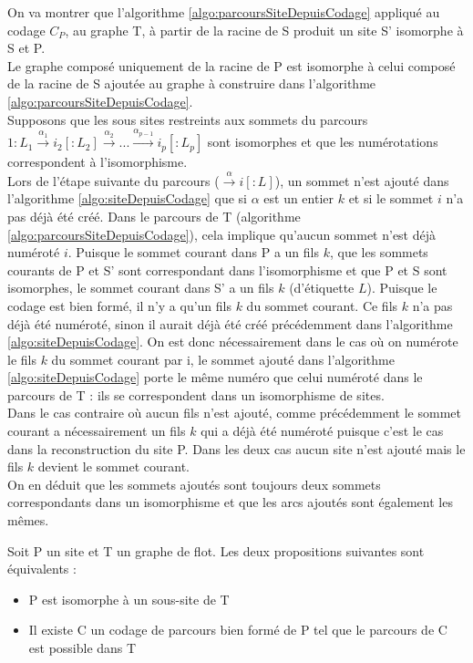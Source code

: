 \begin{pr}
On va montrer que l'algorithme \ref{algo:parcoursSiteDepuisCodage} appliqué au codage $C_P$, au graphe T, à partir de la racine de S produit un site S' isomorphe à S et P. \\
Le graphe composé uniquement de la racine de P est isomorphe à celui composé de la racine de S ajoutée au graphe à construire dans l'algorithme \ref{algo:parcoursSiteDepuisCodage}. \\
Supposons que les sous sites restreints aux sommets du parcours $1:L_1\xrightarrow{\alpha_1}i_2[:L_2]\xrightarrow{\alpha_2} ...\xrightarrow{\alpha_{p-1}}i_{p}[:L_{p}]$ sont isomorphes et que les numérotations correspondent à l'isomorphisme.\\
Lors de l'étape suivante du parcours ($\xrightarrow{\alpha}i[:L]$), un sommet n'est ajouté dans l'algorithme \ref{algo:siteDepuisCodage} que si $\alpha$ est un entier $k$ et si le sommet $i$ n'a pas déjà été créé. Dans le parcours de T (algorithme \ref{algo:parcoursSiteDepuisCodage}), cela implique qu'aucun sommet n'est déjà numéroté $i$. Puisque le sommet courant dans P a un fils $k$, que les sommets courants de P et S' sont correspondant dans l'isomorphisme et que P et S sont isomorphes, le sommet courant dans S' a un fils $k$ (d'étiquette $L$). Puisque le codage est bien formé, il n'y a qu'un fils $k$ du sommet courant. Ce fils $k$ n'a pas déjà été numéroté, sinon il aurait déjà été créé précédemment dans l'algorithme \ref{algo:siteDepuisCodage}. On est donc nécessairement dans le cas où on numérote le fils $k$ du sommet courant par i, le sommet ajouté dans l'algorithme \ref{algo:siteDepuisCodage} porte le même numéro que celui numéroté dans le parcours de T : ils se correspondent dans un isomorphisme de 
sites.\\
Dans le cas contraire où aucun fils n'est ajouté, comme précédemment le sommet courant a nécessairement un fils $k$ qui a déjà été numéroté puisque c'est le cas dans la reconstruction du site P. Dans les deux cas aucun site n'est ajouté mais le fils $k$ devient le sommet courant.\\
On en déduit que les sommets ajoutés sont toujours deux sommets correspondants dans un isomorphisme et que les arcs ajoutés sont également les mêmes.
\end{pr}

\begin{theo}
 Soit P un site et T un graphe de flot. Les deux propositions suivantes sont équivalents :
 \begin{itemize}
  \item P est isomorphe à un sous-site de T
  \item Il existe C un codage de parcours bien formé de P tel que le parcours de C est possible dans T
 \end{itemize}
\label{theo:eqIsoCodage}
\end{theo}

